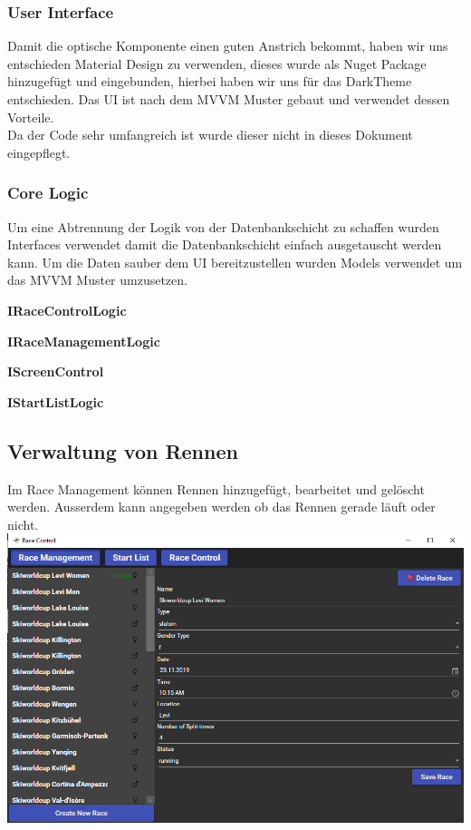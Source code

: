 \documentclass[a4paper, 12pt]{article}
\begin{document}
	\subsubsection{User Interface}
	
	Damit die optische Komponente einen guten Anstrich bekommt, haben wir uns entschieden Material Design zu verwenden, dieses wurde als Nuget Package hinzugefügt und eingebunden, hierbei haben wir uns für das DarkTheme entschieden. Das UI ist nach dem MVVM Muster gebaut und verwendet dessen Vorteile.\\
	Da der Code sehr umfangreich ist wurde dieser nicht in dieses Dokument eingepflegt.
	
	\newpage
	\subsubsection{Core Logic}
	Um eine Abtrennung der Logik von der Datenbankschicht zu schaffen wurden Interfaces verwendet damit die Datenbankschicht einfach ausgetauscht werden kann. Um die Daten sauber dem UI bereitzustellen wurden Models verwendet um das MVVM Muster umzusetzen.
	\newline
	
	\textbf{IRaceControlLogic}
	
	\textbf{IRaceManagementLogic}
	
	\textbf{IScreenControl}
	
	\textbf{IStartListLogic}
	
	
	\subsection{Verwaltung von Rennen}
	Im Race Management können Rennen hinzugefügt, bearbeitet und gelöscht werden. Ausserdem kann angegeben werden ob das Rennen gerade läuft oder nicht.
	\newline
	\includegraphics[width=.7\textwidth]{img/ui_raceManagement.png}
	\newline
	
\end{document}
